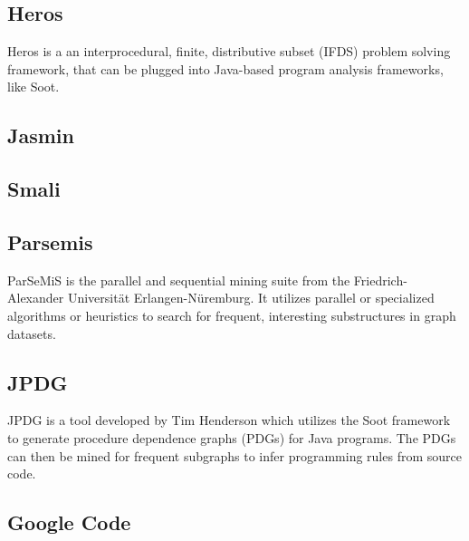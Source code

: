 \documentclass[12pt]{article}
\begin{document}
\subsection{Heros}
Heros is a an interprocedural, finite, distributive subset (IFDS) problem solving framework, that can be plugged into Java-based program analysis frameworks, like Soot.
\subsection{Jasmin}%
\subsection{Smali}%
\subsection{Parsemis}
ParSeMiS is the parallel and sequential mining suite from the Friedrich-Alexander Universit{\"a}t Erlangen-N{\"u}remburg. It utilizes parallel or specialized algorithms or heuristics to search for frequent, interesting substructures in graph datasets.
\subsection{JPDG}
\label{subsection:JPDG}
JPDG is a tool developed by Tim Henderson which utilizes the Soot framework to generate procedure dependence graphs (PDGs) for Java programs. The PDGs can then be mined for frequent subgraphs to infer programming rules from source code.
\subsection{Google Code}
\end{document}
